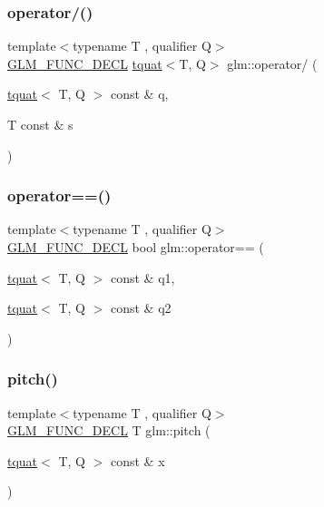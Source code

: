 \subsubsection{\texorpdfstring{operator/()}{operator/()}}
{\footnotesize\ttfamily template$<$typename T , qualifier Q$>$ \\
\hyperlink{setup_8hpp_ab2d052de21a70539923e9bcbf6e83a51}{G\+L\+M\+\_\+\+F\+U\+N\+C\+\_\+\+D\+E\+CL} \hyperlink{structglm_1_1tquat}{tquat}$<$T, Q$>$ glm\+::operator/ (\begin{DoxyParamCaption}\item[{\hyperlink{structglm_1_1tquat}{tquat}$<$ T, Q $>$ const \&}]{q,  }\item[{T const \&}]{s }\end{DoxyParamCaption})}

\mbox{\label{group__gtc__quaternion_ga5892999628e2bcd46279c8df9be904b7}} 
\subsubsection{\texorpdfstring{operator==()}{operator==()}}
{\footnotesize\ttfamily template$<$typename T , qualifier Q$>$ \\
\hyperlink{setup_8hpp_ab2d052de21a70539923e9bcbf6e83a51}{G\+L\+M\+\_\+\+F\+U\+N\+C\+\_\+\+D\+E\+CL} bool glm\+::operator== (\begin{DoxyParamCaption}\item[{\hyperlink{structglm_1_1tquat}{tquat}$<$ T, Q $>$ const \&}]{q1,  }\item[{\hyperlink{structglm_1_1tquat}{tquat}$<$ T, Q $>$ const \&}]{q2 }\end{DoxyParamCaption})}

\mbox{\label{group__gtc__quaternion_ga9bd78e5fe153d07e39fb4c83e73dba73}} 
\subsubsection{\texorpdfstring{pitch()}{pitch()}}
{\footnotesize\ttfamily template$<$typename T , qualifier Q$>$ \\
\hyperlink{setup_8hpp_ab2d052de21a70539923e9bcbf6e83a51}{G\+L\+M\+\_\+\+F\+U\+N\+C\+\_\+\+D\+E\+CL} T glm\+::pitch (\begin{DoxyParamCaption}\item[{\hyperlink{structglm_1_1tquat}{tquat}$<$ T, Q $>$ const \&}]{x }\end{DoxyParamCaption})}

